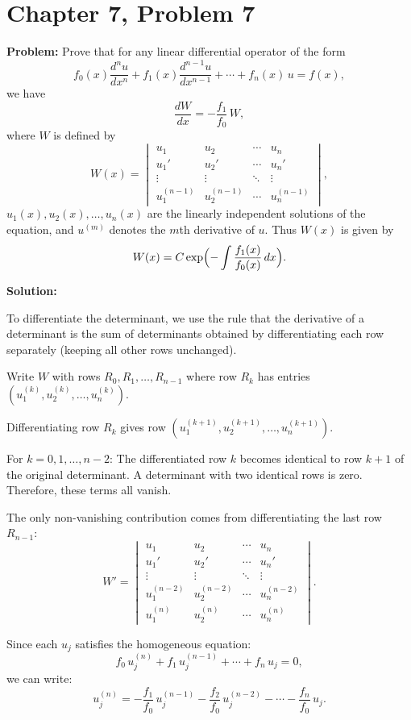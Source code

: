 \documentclass[12pt]{article}
\begin{document}
\section*{Chapter 7, Problem 7}

\textbf{Problem:} Prove that for any linear differential operator of the form
\[
f_0(x)\frac{d^n u}{dx^n} + f_1(x)\frac{d^{n-1}u}{dx^{n-1}} + \cdots + f_n(x)\,u = f(x),
\]
we have
\[
\frac{dW}{dx} = -\frac{f_1}{f_0}\,W,
\]
where $W$ is defined by
\[
W(x) = \begin{vmatrix} u_1 & u_2 & \cdots & u_n \\ u_1' & u_2' & \cdots & u_n' \\ \vdots & \vdots & \ddots & \vdots \\ u_1^{(n-1)} & u_2^{(n-1)} & \cdots & u_n^{(n-1)} \end{vmatrix},
\]
$u_1(x), u_2(x), \ldots, u_n(x)$ are the linearly independent solutions of the equation, and $u^{(m)}$ denotes the $m$th derivative of $u$. Thus $W(x)$ is given by
\[
W(x) = C\exp\Bigl(-\int \frac{f_1(x)}{f_0(x)}\,dx\Bigr).
\]

\bigskip
\textbf{Solution:}

To differentiate the determinant, we use the rule that the derivative of a determinant is the sum of determinants obtained by differentiating each row separately (keeping all other rows unchanged).

Write $W$ with rows $R_0, R_1, \ldots, R_{n-1}$ where row $R_k$ has entries $(u_1^{(k)}, u_2^{(k)}, \ldots, u_n^{(k)})$.

Differentiating row $R_k$ gives row $(u_1^{(k+1)}, u_2^{(k+1)}, \ldots, u_n^{(k+1)})$.

For $k = 0, 1, \ldots, n-2$: The differentiated row $k$ becomes identical to row $k+1$ of the original determinant. A determinant with two identical rows is zero. Therefore, these terms all vanish.

The only non-vanishing contribution comes from differentiating the last row $R_{n-1}$:
\[
W' = \begin{vmatrix} u_1 & u_2 & \cdots & u_n \\ u_1' & u_2' & \cdots & u_n' \\ \vdots & \vdots & \ddots & \vdots \\ u_1^{(n-2)} & u_2^{(n-2)} & \cdots & u_n^{(n-2)} \\ u_1^{(n)} & u_2^{(n)} & \cdots & u_n^{(n)} \end{vmatrix}.
\]

Since each $u_j$ satisfies the homogeneous equation:
\[
f_0\,u_j^{(n)} + f_1\,u_j^{(n-1)} + \cdots + f_n\,u_j = 0,
\]
we can write:
\[
u_j^{(n)} = -\frac{f_1}{f_0}\,u_j^{(n-1)} - \frac{f_2}{f_0}\,u_j^{(n-2)} - \cdots - \frac{f_n}{f_0}\,u_j.
\]
\end{document}
